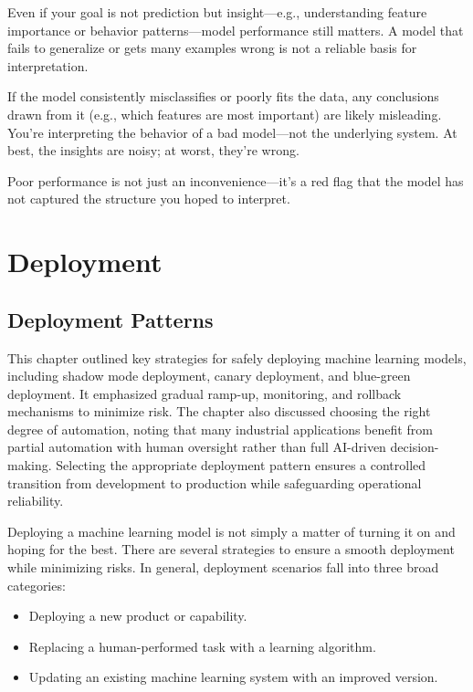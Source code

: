 \documentclass[12pt,openany]{book}
\begin{document}
Even if your goal is not prediction but insight—e.g., understanding feature importance or behavior patterns—model performance still matters. A model that fails to generalize or gets many examples wrong is not a reliable basis for interpretation. \newline

If the model consistently misclassifies or poorly fits the data, any conclusions drawn from it (e.g., which features are most important) are likely misleading. You're interpreting the behavior of a bad model—not the underlying system. At best, the insights are noisy; at worst, they're wrong. \newline

Poor performance is not just an inconvenience—it’s a red flag that the model has not captured the structure you hoped to interpret.





\part{Deployment}




\chapter{Deployment Patterns}

\begin{examplebox} 
This chapter outlined key strategies for safely deploying machine learning models, including shadow mode deployment, canary deployment, and blue-green deployment. It emphasized gradual ramp-up, monitoring, and rollback mechanisms to minimize risk. The chapter also discussed choosing the right degree of automation, noting that many industrial applications benefit from partial automation with human oversight rather than full AI-driven decision-making. Selecting the appropriate deployment pattern ensures a controlled transition from development to production while safeguarding operational reliability. 
\end{examplebox}

Deploying a machine learning model is not simply a matter of turning it on and hoping for the best. There are several strategies to ensure a smooth deployment while minimizing risks. In general, deployment scenarios fall into three broad categories:

\begin{itemize}
    \item Deploying a new product or capability.
    \item Replacing a human-performed task with a learning algorithm.
    \item Updating an existing machine learning system with an improved version.
\end{itemize}
\end{document}
